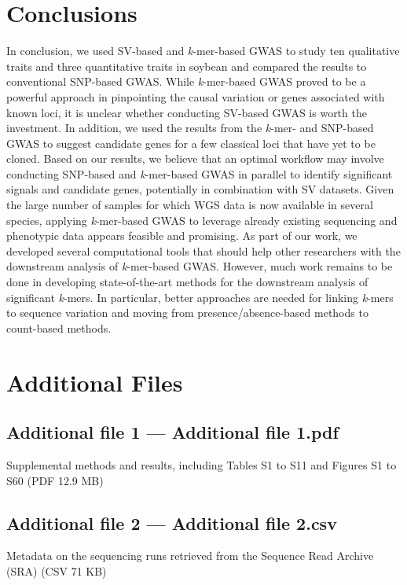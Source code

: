 \documentclass{article}
\begin{document}
\section*{Conclusions}

In conclusion, we used SV-based and \emph{k}-mer-based GWAS to study ten
qualitative traits and three quantitative traits in soybean and
compared the results to conventional SNP-based GWAS. While \emph{k}-mer-based
GWAS proved to be a powerful approach in pinpointing the causal variation or
genes associated with known loci, it is unclear whether conducting SV-based
GWAS is worth the investment. In addition, we used the results from the
\emph{k}-mer- and SNP-based GWAS to suggest candidate genes for a few classical
loci that have yet to be cloned. Based on our results, we believe that an
optimal workflow may involve conducting SNP-based and \emph{k}-mer-based GWAS
in parallel to identify significant signals and candidate genes, potentially in
combination with SV datasets. Given the large number of samples for which WGS
data is now available in several species, applying \emph{k}-mer-based GWAS to
leverage already existing sequencing and phenotypic data appears feasible and
promising.  As part of our work, we developed several computational tools that
should help other researchers with the downstream analysis of
\emph{k}-mer-based GWAS. However, much work remains to be done in
developing state-of-the-art methods for the downstream analysis of significant
\emph{k}-mers. In particular, better approaches are needed for linking
\emph{k}-mers to sequence variation and moving from presence/absence-based
methods to count-based methods.


\section*{Additional Files}

\subsection*{Additional file 1 --- Additional file 1.pdf}
Supplemental methods and results,
including Tables S1 to S11
and Figures S1 to S60 (PDF 12.9 MB)

\subsection*{Additional file 2 --- Additional file 2.csv}
Metadata on the sequencing runs retrieved
from the Sequence Read Archive (SRA) (CSV 71 KB)
\end{document}
